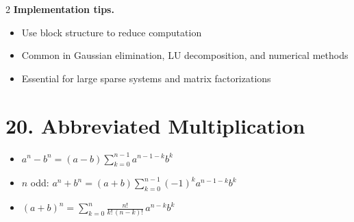 \documentclass[fleqn]{article}
\newcommand{\subhead}[1]{\medskip\noindent\textbf{#1}}
\begin{document}
\begin{multicols}{2}
\subhead{Implementation tips.}
\begin{itemize}
\item Use block structure to reduce computation
\item Common in Gaussian elimination, LU decomposition, and numerical methods
\item Essential for large sparse systems and matrix factorizations
\end{itemize}


\section*{20. Abbreviated Multiplication}
\begin{itemize}
\item $\displaystyle a^n - b^n = (a-b)\sum_{k=0}^{n-1} a^{n-1-k}b^k$
\item $n$ odd: $\displaystyle a^n + b^n = (a+b)\sum_{k=0}^{n-1} (-1)^k a^{n-1-k}b^k$
\item $\displaystyle (a+b)^n = \sum_{k=0}^{n} \frac{n!}{k!\,(n-k)!}\, a^{n-k}b^k$
\end{itemize}

\end{multicols}
\end{document}
